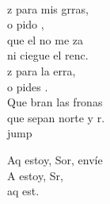 \begin{cancion}[Envíame][Ixcís]
\begin{chorus}
	\end{chorus}%
	\jump\\
	z para mis grras, \\
	o pido , \\
	que el  no me za  \\
	ni  ciegue el renc.\\
	z para la erra,  \\
	o pides .\\
	Que bran las fronas \\
	que sepan norte y r.\\jump\\
	\begin{chorus}%
	Aq estoy, Sor, envíe  \\
	A estoy, Sr, \\
	aq est.  \\
	\end{chorus}%
	\jump\\
\end{cancion}%
